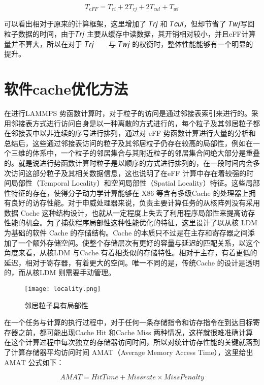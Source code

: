 \begin{equation}
  T_{eFF}=T_{ri}+2T_{rj}+2T_{cul}+T_{wi}
\end{equation}

可以看出相对于原来的计算框架，这里增加了 𝑇𝑟𝑗 和 𝑇𝑐𝑢𝑙，但却节省了 𝑇𝑤𝑗写回粒子数据的时间，由于𝑇𝑟𝑗 主要从缓存中读数据，其开销相对较小，并且eFF计算量并不算大，所以在对于 𝑇𝑟𝑗 􀀁𝑇𝑐𝑢𝑙 与 𝑇𝑤𝑗 的权衡时，整体性能能够有一个明显的提升。

\section{软件cache优化方法}
在进行LAMMPS 势函数计算时，对于粒子的访问是通过邻接表索引来进行的。采用邻接表方式进行访问自身是以一种离散的方式进行的，每个粒子及其邻居粒子都在邻接表中以非连续的序号进行排列，通过对 eFF 势函数计算进行大量的分析和总结后，这些通过邻接表访问的粒子及其邻居粒子仍存在较高的局部性，例如在一个三维的体系中，一个粒子的邻居集合与其附近粒子的邻居集合间绝大部分是重叠的。就是说进行势函数计算时粒子是以顺序的方式进行排列的，在一段时间内会多次访问这部分粒子及其相关数据信息，这也说明了在eFF 计算中存在着较强的时间局部性（Temporal Locality）和空间局部性（Spatial Locality）特征。这些局部性特征的存在，使得分子动力学计算能够在 X86 等含有多级Cache 的处理器上拥有良好的访存性能。对于申威处理器来说，负责主要计算任务的从核阵列没有采用数据 Cache 这种结构设计，也就从一定程度上失去了利用程序局部性来提高访存性能的机会。为了捕获程序局部性这种性能优化的特征，这里设计了以从核 LDM 为基础的软件 Cache 的存储结构。Cache 的本质只不过是在主存和寄存器之间添加了一个额外存储空间。使整个存储层次有更好的容量与延迟的匹配关系，以这个角度来看，从核LDM 与Cache 有着相类似的存储特性。相对于主存，有着更低的延迟，相对于寄存器，有着更大的空间。唯一不同的是，传统Cache 的设计是透明的，而从核LDM 则需要手动管理。

 \begin{figure}[h]
  \centering
  \texttt{[image: locality.png]}
  \caption{邻居粒子具有局部性}
\end{figure}

 在一个任务与计算的执行过程中，对于任何一条存储指令和访存指令在到达目标寄存器之前，都可能出现Cache Hit 和Cache Miss 两种情况，这样就很难准确计算在这个计算过程中每次独立的存储器访问时间，所以对统计访存性能的关键就落到了计算存储器平均访问时间 AMAT（Average Memory Access Time），这里给出 AMAT 公式如下：

 \begin{equation}
   AMAT = HitTime+Missrate \times MissPenalty
 \end{equation}

